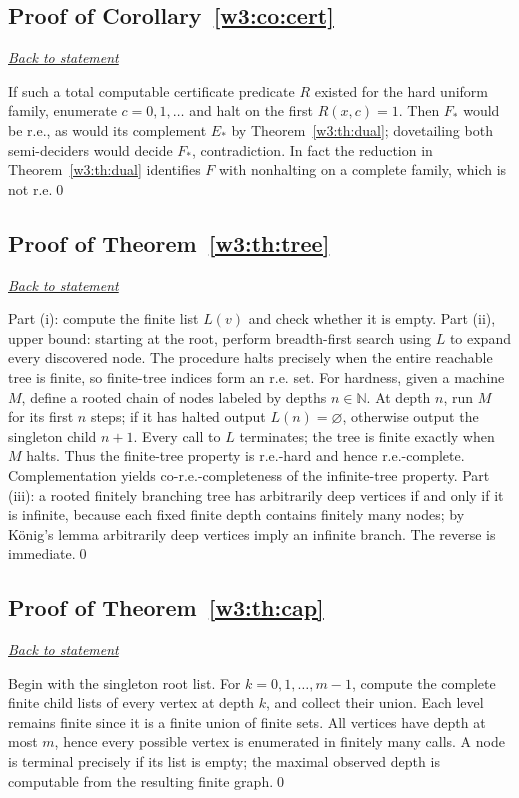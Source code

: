 \documentclass[11pt,letterpaper]{article}
\theoremstyle{definition}\newtheorem{definition}[theorem]{Definition}\newtheorem{example}[theorem]{Example}
\theoremstyle{remark}\newtheorem{remark}[theorem]{Remark}
\newcommand{\backlink}[1]{\noindent\hyperref[#1]{\textit{Back to statement}}\par\smallskip}
\begin{document}
\subsection{Proof of Corollary~\ref{w3:co:cert}}\label{w3:pr:cert}\backlink{w3:co:cert}
If such a total computable certificate predicate $R$ existed for the hard uniform family, enumerate $c=0,1,\dots$ and halt on the first $R(x,c)=1$. Then $F_*$ would be r.e., as would its complement $E_*$ by Theorem~\ref{w3:th:dual}; dovetailing both semi-deciders would decide $F_*$, contradiction. In fact the reduction in Theorem~\ref{w3:th:dual} identifies $F$ with nonhalting on a complete family, which is not r.e.\qed

\subsection{Proof of Theorem~\ref{w3:th:tree}}\label{w3:pr:tree}\backlink{w3:th:tree}
Part (i): compute the finite list $L(v)$ and check whether it is empty. Part (ii), upper bound: starting at the root, perform breadth-first search using $L$ to expand every discovered node. The procedure halts precisely when the entire reachable tree is finite, so finite-tree indices form an r.e. set. For hardness, given a machine $M$, define a rooted chain of nodes labeled by depths $n\in\mathbb N$. At depth $n$, run $M$ for its first $n$ steps; if it has halted output $L(n)=\varnothing$, otherwise output the singleton child $n+1$. Every call to $L$ terminates; the tree is finite exactly when $M$ halts. Thus the finite-tree property is r.e.-hard and hence r.e.-complete. Complementation yields co-r.e.-completeness of the infinite-tree property. Part (iii): a rooted finitely branching tree has arbitrarily deep vertices if and only if it is infinite, because each fixed finite depth contains finitely many nodes; by K\"onig's lemma arbitrarily deep vertices imply an infinite branch. The reverse is immediate.\qed

\subsection{Proof of Theorem~\ref{w3:th:cap}}\label{w3:pr:cap}\backlink{w3:th:cap}
Begin with the singleton root list. For $k=0,1,\dots,m-1$, compute the complete finite child lists of every vertex at depth $k$, and collect their union. Each level remains finite since it is a finite union of finite sets. All vertices have depth at most $m$, hence every possible vertex is enumerated in finitely many calls. A node is terminal precisely if its list is empty; the maximal observed depth is computable from the resulting finite graph.\qed
\end{document}
